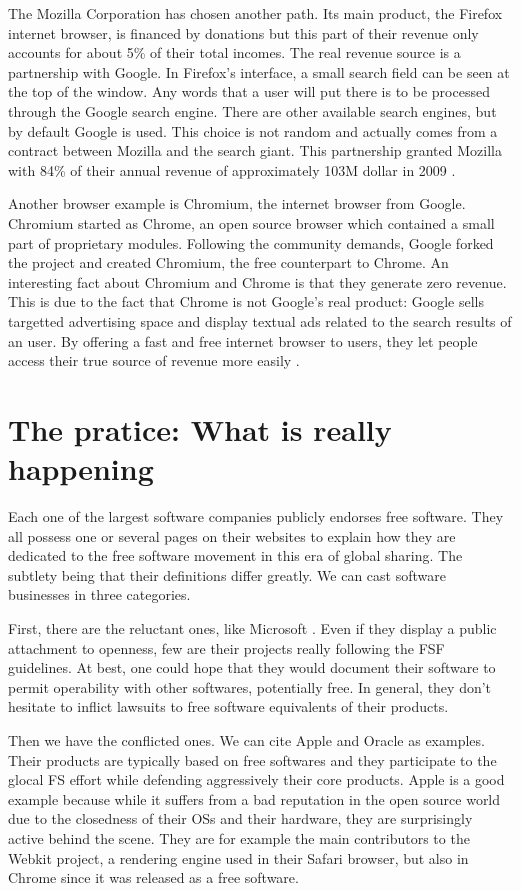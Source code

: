 \documentclass[12pt]{article}
\begin{document}
The Mozilla Corporation has chosen another path. Its main product, the
Firefox internet browser, is financed by donations but this part of
their revenue only accounts for about 5\% of their total incomes. The
real revenue source is a partnership with Google. In Firefox's
interface, a small search field can be seen at the top of the
window. Any words that a user will put there is to be processed
through the Google search engine. There are other available search
engines, but by default Google is used. This choice is not random and
actually comes from a contract between Mozilla and the search
giant. This partnership granted Mozilla with 84\% of their annual
revenue of approximately 103M dollar in 2009 \cite{moz}.

Another browser example is Chromium, the internet browser from
Google. Chromium started as Chrome, an open source browser which
contained a small part of proprietary modules. Following the community
demands, Google forked the project and created Chromium, the free
counterpart to Chrome. An interesting fact about Chromium and Chrome
is that they generate zero revenue. This is due to the fact that
Chrome is not Google's real product: Google sells targetted
advertising space and display textual ads related to the search
results of an user. By offering a fast and free internet browser to
users, they let people access their true source of revenue more
easily \cite{shuttle}.

\section{The pratice: What is really happening}

Each one of the largest software companies publicly endorses free
software. They all possess one or several pages on their websites to
explain how they are dedicated to the free software movement in this
era of global sharing. The subtlety being that their definitions
differ greatly. We can cast software businesses in three categories.

First, there are the reluctant ones, like Microsoft \cite{woss}. Even
if they display a public attachment to openness, few are their
projects really following the FSF guidelines. At best, one could hope
that they would document their software to permit operability with
other softwares, potentially free. In general, they don't hesitate to
inflict lawsuits to free software equivalents of their products.

Then we have the conflicted ones. We can cite Apple and Oracle as
examples. Their products are typically based on free softwares and
they participate to the glocal FS effort while defending aggressively
their core products. Apple is a good example because while it suffers
from a bad reputation in the open source world due to the closedness
of their OSs and their hardware, they are surprisingly active behind
the scene. They are for example the main contributors to the Webkit
project, a rendering engine used in their Safari browser, but also in
Chrome since it was released as a free software.
\end{document}
